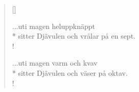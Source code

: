 \begin{verse}[\versewidth]

...uti magen heluppknäppt\\*
sitter Djävulen och vrålar på en sept.\\!


...uti magen varm och kvav\\*
sitter Djävulen och väser på oktav.\\!


\end{verse}

